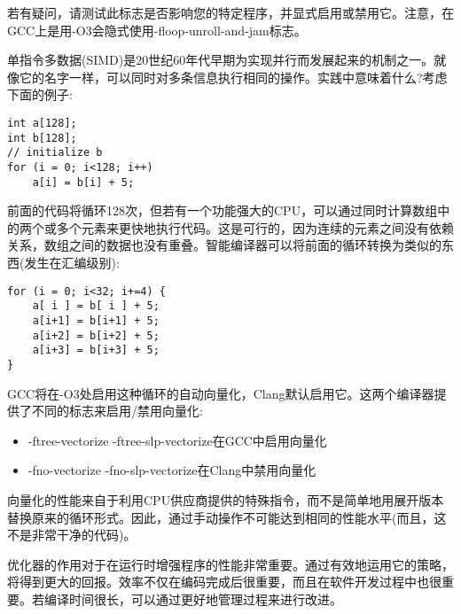 若有疑问，请测试此标志是否影响您的特定程序，并显式启用或禁用它。注意，在GCC上是用-O3会隐式使用-floop-unroll-and-jam标志。


单指令多数据(SIMD)是20世纪60年代早期为实现并行而发展起来的机制之一。就像它的名字一样，可以同时对多条信息执行相同的操作。实践中意味着什么?考虑下面的例子:

\begin{lstlisting}[style=styleCXX]
int a[128];
int b[128];
// initialize b
for (i = 0; i<128; i++)
	a[i] = b[i] + 5;
\end{lstlisting}

前面的代码将循环128次，但若有一个功能强大的CPU，可以通过同时计算数组中的两个或多个元素来更快地执行代码。这是可行的，因为连续的元素之间没有依赖关系，数组之间的数据也没有重叠。智能编译器可以将前面的循环转换为类似的东西(发生在汇编级别):

\begin{lstlisting}[style=styleCXX]
for (i = 0; i<32; i+=4) {
	a[ i ] = b[ i ] + 5;
	a[i+1] = b[i+1] + 5;
	a[i+2] = b[i+2] + 5;
	a[i+3] = b[i+3] + 5;
}
\end{lstlisting}

GCC将在-O3处启用这种循环的自动向量化，Clang默认启用它。这两个编译器提供了不同的标志来启用/禁用向量化:

\begin{itemize}
\item 
-ftree-vectorize -ftree-slp-vectorize在GCC中启用向量化

\item 
-fno-vectorize -fno-slp-vectorize在Clang中禁用向量化
\end{itemize}

向量化的性能来自于利用CPU供应商提供的特殊指令，而不是简单地用展开版本替换原来的循环形式。因此，通过手动操作不可能达到相同的性能水平(而且，这不是非常干净的代码)。

优化器的作用对于在运行时增强程序的性能非常重要。通过有效地运用它的策略，将得到更大的回报。效率不仅在编码完成后很重要，而且在软件开发过程中也很重要。若编译时间很长，可以通过更好地管理过程来进行改进。




